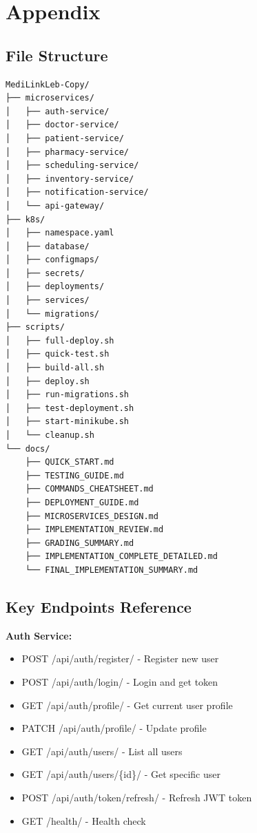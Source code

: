 \documentclass[12pt,a4paper]{article}
\begin{document}
\section{Appendix}

\subsection{File Structure}
\begin{lstlisting}[style=bash]
MediLinkLeb-Copy/
├── microservices/
│   ├── auth-service/
│   ├── doctor-service/
│   ├── patient-service/
│   ├── pharmacy-service/
│   ├── scheduling-service/
│   ├── inventory-service/
│   ├── notification-service/
│   └── api-gateway/
├── k8s/
│   ├── namespace.yaml
│   ├── database/
│   ├── configmaps/
│   ├── secrets/
│   ├── deployments/
│   ├── services/
│   └── migrations/
├── scripts/
│   ├── full-deploy.sh
│   ├── quick-test.sh
│   ├── build-all.sh
│   ├── deploy.sh
│   ├── run-migrations.sh
│   ├── test-deployment.sh
│   ├── start-minikube.sh
│   └── cleanup.sh
└── docs/
    ├── QUICK_START.md
    ├── TESTING_GUIDE.md
    ├── COMMANDS_CHEATSHEET.md
    ├── DEPLOYMENT_GUIDE.md
    ├── MICROSERVICES_DESIGN.md
    ├── IMPLEMENTATION_REVIEW.md
    ├── GRADING_SUMMARY.md
    ├── IMPLEMENTATION_COMPLETE_DETAILED.md
    └── FINAL_IMPLEMENTATION_SUMMARY.md
\end{lstlisting}

\subsection{Key Endpoints Reference}

\textbf{Auth Service:}
\begin{itemize}
    \item POST /api/auth/register/ - Register new user
    \item POST /api/auth/login/ - Login and get token
    \item GET /api/auth/profile/ - Get current user profile
    \item PATCH /api/auth/profile/ - Update profile
    \item GET /api/auth/users/ - List all users
    \item GET /api/auth/users/\{id\}/ - Get specific user
    \item POST /api/auth/token/refresh/ - Refresh JWT token
    \item GET /health/ - Health check
\end{itemize}
\end{document}
